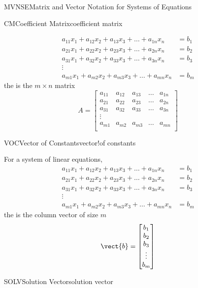 \begin{subsect}{MVNSE}{Matrix and Vector Notation for Systems of Equations}
\begin{definition}{CM}{Coefficient Matrix}{coefficient matrix}
\begin{para}
\begin{align*}
a_{11}x_1+a_{12}x_2+a_{13}x_3+\dots+a_{1n}x_n&=b_1\\
a_{21}x_1+a_{22}x_2+a_{23}x_3+\dots+a_{2n}x_n&=b_2\\
a_{31}x_1+a_{32}x_2+a_{33}x_3+\dots+a_{3n}x_n&=b_3\\
\vdots&\\
a_{m1}x_1+a_{m2}x_2+a_{m3}x_3+\dots+a_{mn}x_n&=b_m
\end{align*}
the  is the $m\times n$ matrix
\begin{equation*}
A=
\begin{bmatrix}
a_{11}&a_{12}&a_{13}&\dots&a_{1n}\\
a_{21}&a_{22}&a_{23}&\dots&a_{2n}\\
a_{31}&a_{32}&a_{33}&\dots&a_{3n}\\
\vdots&\\
a_{m1}&a_{m2}&a_{m3}&\dots&a_{mn}\\
\end{bmatrix}
\end{equation*}
\end{para}
\end{definition}
%
\begin{definition}{VOC}{Vector of Constants}{vector!of constants}
\begin{para}For a system of linear equations,
\begin{align*}
a_{11}x_1+a_{12}x_2+a_{13}x_3+\dots+a_{1n}x_n&=b_1\\
a_{21}x_1+a_{22}x_2+a_{23}x_3+\dots+a_{2n}x_n&=b_2\\
a_{31}x_1+a_{32}x_2+a_{33}x_3+\dots+a_{3n}x_n&=b_3\\
\vdots&\\
a_{m1}x_1+a_{m2}x_2+a_{m3}x_3+\dots+a_{mn}x_n&=b_m
\end{align*}
the  is the column vector of size $m$
\begin{equation*}
\vect{b}=
\begin{bmatrix}
b_1\\
b_2\\
b_3\\
\vdots\\
b_m\\
\end{bmatrix}
\end{equation*}
\end{para}
\end{definition}
%
\begin{definition}{SOLV}{Solution Vector}{solution vector}

\end{definition}
\end{subsect}
